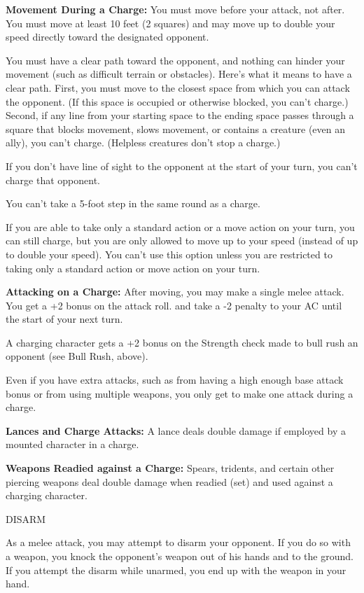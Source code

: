 \documentclass{article}
\begin{document}
\textbf{Movement During a Charge:} You must move before your attack, not after. 
You must move at least 10 feet (2 squares) and may move up to double your speed 
directly toward the designated opponent.

You must have a clear path toward the opponent, and nothing can hinder your movement 
(such as difficult terrain or obstacles). Here's what it means to have a clear 
path. First, you must move to the closest space from which you can attack the opponent. 
(If this space is occupied or otherwise blocked, you can't charge.) Second, if 
any line from your starting space to the ending space passes through a square that 
blocks movement, slows movement, or contains a creature (even an ally), you can't 
charge. (Helpless creatures don't stop a charge.)

If you don't have line of sight to the opponent at the start of your turn, you 
can't charge that opponent.

You can't take a 5-foot step in the same round as a charge.

If you are able to take only a standard action or a move action on your turn, you 
can still charge, but you are only allowed to move up to your speed (instead of 
up to double your speed). You can't use this option unless you are restricted to 
taking only a standard action or move action on your turn.

\textbf{Attacking on a Charge:} After moving, you may make a single melee attack. 
You get a +2 bonus on the attack roll. and take a -2 penalty to your AC until the 
start of your next turn.

A charging character gets a +2 bonus on the Strength check made to bull rush an 
opponent (see Bull Rush, above).

Even if you have extra attacks, such as from having a high enough base attack bonus 
or from using multiple weapons, you only get to make one attack during a charge.

\textbf{Lances and Charge Attacks:} A lance deals double damage if employed by 
a mounted character in a charge.

\textbf{Weapons Readied against a Charge: }Spears, tridents, and certain other 
piercing weapons deal double damage when readied (set) and used against a charging 
character.

\vspace{12pt}
DISARM

As a melee attack, you may attempt to disarm your opponent. If you do so with a 
weapon, you knock the opponent's weapon out of his hands and to the ground. If 
you attempt the disarm while unarmed, you end up with the weapon in your hand.
\end{document}
